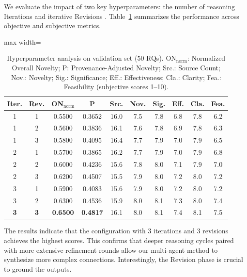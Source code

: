 \documentclass[runningheads]{llncs}
\begin{document}
We evaluate the impact of two key hyperparameters: the number of reasoning Iterations and iterative Revisions . Table~\ref{tab:hyperparam_results} summarizes the performance across objective and subjective metrics.

\begin{table}[t]
\centering
\small
\begin{adjustbox}{max width=\textwidth}
\begin{tabular}{cccccccccc}
\toprule
\textbf{Iter.} & \textbf{Rev.} & \textbf{ON$_{\text{norm}}$} & \textbf{P} & \textbf{Src.} & \textbf{Nov.} & \textbf{Sig.} & \textbf{Eff.} & \textbf{Cla.} & \textbf{Fea.} \\
\midrule
1 & 1 & 0.5500 & 0.3652 & 16.0 & 7.5 & 7.8 & 6.8 & 7.8 & 6.2 \\
1 & 2 & 0.5600 & 0.3836 & 16.1 & 7.6 & 7.8 & 6.9 & 7.8 & 6.3 \\
1 & 3 & 0.5800 & 0.4095 & 16.4 & 7.7 & 7.9 & 7.0 & 7.9 & 6.5 \\
2 & 1 & 0.5700 & 0.3865 & 16.2 & 7.7 & 7.9 & 7.0 & 7.9 & 6.8 \\
2 & 2 & 0.6000 & 0.4236 & 15.6 & 7.8 & 8.0 & 7.1 & 7.9 & 7.0 \\
2 & 3 & 0.6200 & 0.4507 & 15.5 & 7.9 & 8.0 & 7.2 & 8.0 & 7.2 \\
3 & 1 & 0.5900 & 0.4083 & 15.6 & 7.9 & 8.0 & 7.2 & 8.0 & 7.2 \\
3 & 2 & 0.6300 & 0.4536 & 15.9 & 8.0 & 8.1 & 7.3 & 8.0 & 7.4 \\
\textbf{3} & \textbf{3} & \textbf{0.6500} & \textbf{0.4817} & 16.1 & 8.0 & 8.1 & 7.4 & 8.1 & 7.5 \\
\bottomrule
\end{tabular}
\end{adjustbox}
\caption{Hyperparameter analysis on validation set (50 RQs). ON$_{\text{norm}}$: Normalized Overall Novelty; P: Provenance-Adjusted Novelty; Src.: Source Count; Nov.: Novelty; Sig.: Significance; Eff.: Effectiveness; Cla.: Clarity; Fea.: Feasibility (subjective scores 1--10).}
\label{tab:hyperparam_results}
\end{table}

The results indicate that the configuration with 3 iterations and 3 revisions achieves the highest scores. This confirms that deeper reasoning cycles paired with more extensive refinement rounds allow our multi-agent method to synthesize more complex connections. Interestingly, the Revision phase is crucial to ground the outputs.
\end{document}
